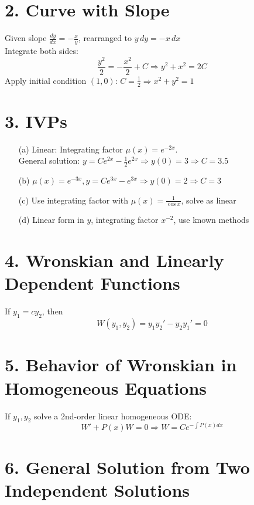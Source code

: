 \documentclass[12pt]{article}
\begin{document}
\section*{2. Curve with Slope}

Given slope \( \frac{dy}{dx} = -\frac{x}{y} \), rearranged to \( y\,dy = -x\,dx \)\\
Integrate both sides:
\[
\frac{y^2}{2} = -\frac{x^2}{2} + C \Rightarrow y^2 + x^2 = 2C
\]
Apply initial condition \( (1, 0) \): \( C = \frac{1}{2} \Rightarrow x^2 + y^2 = 1 \)

\section*{3. IVPs}

\begin{enumerate}
  \item[(a)] Linear: Integrating factor \( \mu(x) = e^{-2x} \).\\
  General solution: \( y = Ce^{2x} - \frac{1}{2}e^{2x} \Rightarrow y(0)=3 \Rightarrow C = 3.5 \)

  \item[(b)] \( \mu(x) = e^{-3x}, y = Ce^{3x} - e^{3x} \Rightarrow y(0) = 2 \Rightarrow C = 3 \)

  \item[(c)] Use integrating factor with \( \mu(x) = \frac{1}{\cos x} \), solve as linear

  \item[(d)] Linear form in \( y \), integrating factor \( x^{-2} \), use known methods
\end{enumerate}

\section*{4. Wronskian and Linearly Dependent Functions}

If \( y_1 = c y_2 \), then
\[
W(y_1, y_2) = y_1 y_2' - y_2 y_1' = 0
\]

\section*{5. Behavior of Wronskian in Homogeneous Equations}

If \( y_1, y_2 \) solve a 2nd-order linear homogeneous ODE:
\[
W' + P(x) W = 0 \Rightarrow W = C e^{-\int P(x) dx}
\]

\section*{6. General Solution from Two Independent Solutions}
\end{document}
